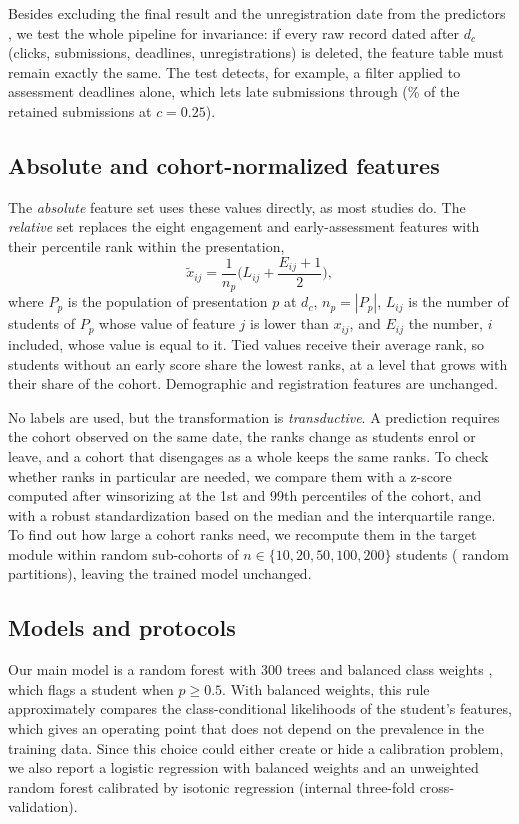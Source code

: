 \documentclass[fleqn,10pt]{JLA_article}
\begin{document}
Besides excluding the final result and the unregistration date from the predictors \parencite{kaufman2012leakage}, we test the whole pipeline for invariance: if every raw record dated after $d_c$ (clicks, submissions, deadlines, unregistrations) is deleted, the feature table must remain exactly the same. The test detects, for example, a filter applied to assessment deadlines alone, which lets late submissions through (\resPctLateSub\% of the retained submissions at $c=0.25$).

\subsection{Absolute and cohort-normalized features}
The \emph{absolute} feature set uses these values directly, as most studies do. The \emph{relative} set replaces the eight engagement and early-assessment features with their percentile rank within the presentation,
\begin{equation}
\tilde{x}_{ij} = \frac{1}{n_p}\Big(L_{ij} + \frac{E_{ij}+1}{2}\Big),
\label{eq:rank}
\end{equation}
where $P_p$ is the population of presentation $p$ at $d_c$, $n_p=|P_p|$, $L_{ij}$ is the number of students of $P_p$ whose value of feature $j$ is lower than $x_{ij}$, and $E_{ij}$ the number, $i$ included, whose value is equal to it. Tied values receive their average rank, so students without an early score share the lowest ranks, at a level that grows with their share of the cohort. Demographic and registration features are unchanged.

No labels are used, but the transformation is \emph{transductive}. A prediction requires the cohort observed on the same date, the ranks change as students enrol or leave, and a cohort that disengages as a whole keeps the same ranks. To check whether ranks in particular are needed, we compare them with a z-score computed after winsorizing at the 1st and 99th percentiles of the cohort, and with a robust standardization based on the median and the interquartile range. To find out how large a cohort ranks need, we recompute them in the target module within random sub-cohorts of $n\in\{10,20,50,100,200\}$ students (\resNPartitions{} random partitions), leaving the trained model unchanged.

\subsection{Models and protocols}
Our main model is a random forest \parencite{breiman2001rf} with 300 trees and balanced class weights \parencite[scikit-learn;][]{pedregosa2011sklearn}, which flags a student when $\hat{p}\geq 0.5$. With balanced weights, this rule approximately compares the class-conditional likelihoods of the student's features, which gives an operating point that does not depend on the prevalence in the training data. Since this choice could either create or hide a calibration problem, we also report a logistic regression with balanced weights and an unweighted random forest calibrated by isotonic regression (internal three-fold cross-validation).
\end{document}
